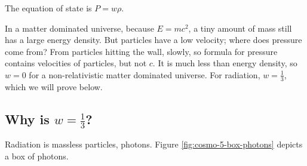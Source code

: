 \documentclass[]{article}
\begin{document}
The equation of state is $P = w\rho$.

In a matter dominated universe, because $E=mc^2$, a tiny amount of mass still has a large energy density. But particles have a low velocity; where does pressure come from? From particles hitting the wall, slowly, so formula for pressure contains velocities of particles, but not $c$. It is much less than energy density, so $w=0$ for a non-relativistic matter dominated universe. For radiation, $w=\frac{1}{3}$, which we will prove below.

\subsection{Why is $w=\frac{1}{3}$?}

Radiation is massless particles, photons. Figure \ref{fig:cosmo-5-box-photons} depicts a box of photons.
\end{document}
